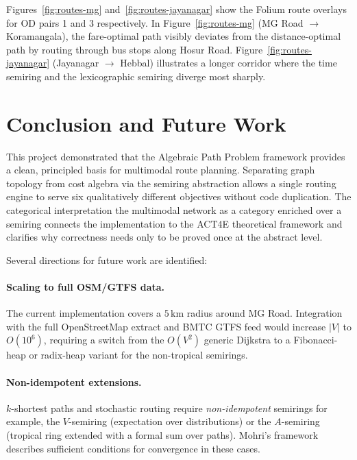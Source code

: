 \documentclass[12pt,a4paper]{article}
\begin{document}
Figures~\ref{fig:routes-mg} and~\ref{fig:routes-jayanagar} show the
Folium route overlays for OD pairs 1 and 3 respectively. In
Figure~\ref{fig:routes-mg} (MG Road $\to$ Koramangala), the
fare-optimal path visibly deviates from the distance-optimal path by
routing through bus stops along Hosur Road. Figure~\ref{fig:routes-jayanagar}
(Jayanagar $\to$ Hebbal) illustrates a longer corridor where the time
semiring and the lexicographic semiring diverge most sharply.

\section{Conclusion and Future Work}
\label{sec:conclusion}

This project demonstrated that the Algebraic Path Problem framework
provides a clean, principled basis for multimodal route planning.
Separating graph topology from cost algebra via the semiring abstraction
allows a single routing engine to serve six qualitatively different
objectives without code duplication.  The categorical interpretation  the
multimodal network as a category enriched over a semiring  connects the
implementation to the ACT4E theoretical framework and clarifies why
correctness needs only to be proved once at the abstract level.

Several directions for future work are identified:

\paragraph{Scaling to full OSM/GTFS data.}
The current implementation covers a $5\,\mathrm{km}$ radius around MG Road.
Integration with the full OpenStreetMap extract and BMTC GTFS feed would
increase $|V|$ to $O(10^6)$, requiring a switch from the $O(V^2)$ generic
Dijkstra to a Fibonacci-heap or radix-heap variant for the non-tropical
semirings.

\paragraph{Non-idempotent extensions.}
$k$-shortest paths and stochastic routing require \emph{non-idempotent}
semirings  for example, the $V$-semiring (expectation over distributions)
or the $A$-semiring (tropical ring extended with a formal sum over paths).
Mohri's framework~\cite{mohri2002} describes sufficient conditions for
convergence in these cases.
\end{document}

